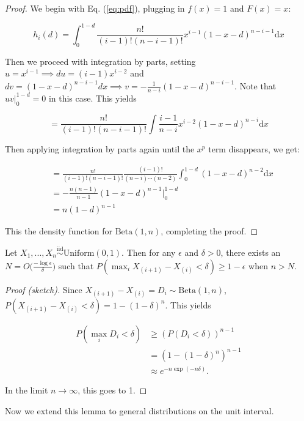 \documentclass[12pt]{article}
\begin{document}
\begin{proof}
We begin with Eq. (\ref{eq:pdf}), plugging in $f(x) = 1$ and $F(x) = x$:

$$
h_i(d) = \int_0^{1-d} \frac{n!}{(i-1)! (n-i-1)!} x^{i-1} (1-x-d)^{n-i-1} \mathrm{d}x
$$

Then we proceed with integration by parts, setting 
$u = x^{i-1} \implies du = (i-1) x^{i-2}$ and 
$dv = (1-x-d)^{n-i-1} dx \implies v = -\frac{1}{n-i} (1-x-d)^{n-i-1}$. 
Note that $u v |_0^{1-d} = 0$ in this case. This yields

$$
= \frac{n!}{(i-1)! (n-i-1)!} \int \frac{i-1}{n-i} x^{i-2} (1-x-d)^{n-i} \mathrm{d}x
$$

Then applying integration by parts again until the $x^p$ term disappears, we get:

$$
\begin{aligned}
& = \frac{n!}{(i-1)! (n-i-1)!} \frac{(i-1)!}{(n-i) \cdots (n-2)} \int_0^{1-d} (1-x-d)^{n-2} \mathrm{d}x \\
& = -\frac{n (n-1)}{n-1} (1-x-d)^{n-1} \Big|_0^{1-d} \\
& = n (1 - d)^{n-1}
\end{aligned}
$$

This the density function for $\mathrm{Beta}(1, n)$, completing the proof.
\end{proof}

\begin{lemma}
Let $X_1, ..., X_n \stackrel{\mathrm{iid}}{\sim}\mathrm{Uniform}(0, 1)$. 
Then for any $\epsilon$ and $\delta > 0$, 
there exists an $N = O \big(\frac{-\log \epsilon}{\delta} \big)$ such that 
$P(\max_i X_{(i+1)} - X_{(i)} < \delta) \geq 1 - \epsilon$ when $n > N$.
\end{lemma}

\begin{proof}[Proof (sketch)]
Since $X_{(i+1)} - X_{(i)} = D_i \sim \mathrm{Beta}(1, n)$, 
$P(X_{(i+1)} - X_{(i)} < \delta) = 1 - (1 - \delta)^n $. This yields

$$
\begin{aligned}
P(\max_i D_i < \delta) & \geq (P(D_i < \delta))^{n-1} \\
& = (1 - (1 - \delta)^n)^{n-1} \\
& \approx e^{-n \exp(-n \delta)}.
\end{aligned}
$$

In the limit $n \to \infty$, this goes to 1.
\end{proof}

Now we extend this lemma to general distributions on the unit interval.
\end{document}
